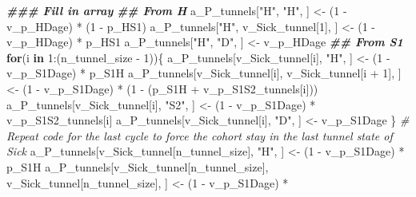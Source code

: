 \documentclass[
]{article}
\newenvironment{Shaded}{\begin{snugshade}}{\end{snugshade}}
\newcommand{\CommentTok}[1]{\textcolor[rgb]{0.56,0.35,0.01}{\textit{#1}}}
\newcommand{\ControlFlowTok}[1]{\textcolor[rgb]{0.13,0.29,0.53}{\textbf{#1}}}
\newcommand{\DecValTok}[1]{\textcolor[rgb]{0.00,0.00,0.81}{#1}}
\newcommand{\DocumentationTok}[1]{\textcolor[rgb]{0.56,0.35,0.01}{\textbf{\textit{#1}}}}
\newcommand{\NormalTok}[1]{#1}
\newcommand{\OtherTok}[1]{\textcolor[rgb]{0.56,0.35,0.01}{#1}}
\newcommand{\SpecialCharTok}[1]{\textcolor[rgb]{0.00,0.00,0.00}{#1}}
\newcommand{\StringTok}[1]{\textcolor[rgb]{0.31,0.60,0.02}{#1}}
\begin{document}
\begin{Shaded}
\begin{Highlighting}[]
\DocumentationTok{\#\#\# Fill in array}
\DocumentationTok{\#\# From H}
\NormalTok{a\_P\_tunnels[}\StringTok{"H"}\NormalTok{, }\StringTok{"H"}\NormalTok{, ]              }\OtherTok{\textless{}{-}}\NormalTok{ (}\DecValTok{1} \SpecialCharTok{{-}}\NormalTok{ v\_p\_HDage) }\SpecialCharTok{*}\NormalTok{ (}\DecValTok{1} \SpecialCharTok{{-}}\NormalTok{ p\_HS1)}
\NormalTok{a\_P\_tunnels[}\StringTok{"H"}\NormalTok{, v\_Sick\_tunnel[}\DecValTok{1}\NormalTok{], ] }\OtherTok{\textless{}{-}}\NormalTok{ (}\DecValTok{1} \SpecialCharTok{{-}}\NormalTok{ v\_p\_HDage) }\SpecialCharTok{*}\NormalTok{ p\_HS1}
\NormalTok{a\_P\_tunnels[}\StringTok{"H"}\NormalTok{, }\StringTok{"D"}\NormalTok{, ]              }\OtherTok{\textless{}{-}}\NormalTok{ v\_p\_HDage}
\DocumentationTok{\#\# From S1}
\ControlFlowTok{for}\NormalTok{(i }\ControlFlowTok{in} \DecValTok{1}\SpecialCharTok{:}\NormalTok{(n\_tunnel\_size }\SpecialCharTok{{-}} \DecValTok{1}\NormalTok{))\{}
\NormalTok{  a\_P\_tunnels[v\_Sick\_tunnel[i], }\StringTok{"H"}\NormalTok{, ]  }\OtherTok{\textless{}{-}}\NormalTok{ (}\DecValTok{1} \SpecialCharTok{{-}}\NormalTok{ v\_p\_S1Dage) }\SpecialCharTok{*}\NormalTok{ p\_S1H}
\NormalTok{  a\_P\_tunnels[v\_Sick\_tunnel[i], }
\NormalTok{              v\_Sick\_tunnel[i }\SpecialCharTok{+} \DecValTok{1}\NormalTok{], ]   }\OtherTok{\textless{}{-}}\NormalTok{ (}\DecValTok{1} \SpecialCharTok{{-}}\NormalTok{ v\_p\_S1Dage) }\SpecialCharTok{*}
\NormalTok{                                           (}\DecValTok{1} \SpecialCharTok{{-}}\NormalTok{ (p\_S1H }\SpecialCharTok{+}\NormalTok{ v\_p\_S1S2\_tunnels[i]))}
\NormalTok{  a\_P\_tunnels[v\_Sick\_tunnel[i], }\StringTok{"S2"}\NormalTok{, ] }\OtherTok{\textless{}{-}}\NormalTok{ (}\DecValTok{1} \SpecialCharTok{{-}}\NormalTok{ v\_p\_S1Dage) }\SpecialCharTok{*}\NormalTok{ v\_p\_S1S2\_tunnels[i]}
\NormalTok{  a\_P\_tunnels[v\_Sick\_tunnel[i], }\StringTok{"D"}\NormalTok{, ]  }\OtherTok{\textless{}{-}}\NormalTok{ v\_p\_S1Dage}
\NormalTok{\}}
\CommentTok{\# Repeat code for the last cycle to force the cohort stay in the last tunnel state of Sick}
\NormalTok{a\_P\_tunnels[v\_Sick\_tunnel[n\_tunnel\_size], }\StringTok{"H"}\NormalTok{, ]  }\OtherTok{\textless{}{-}}\NormalTok{ (}\DecValTok{1} \SpecialCharTok{{-}}\NormalTok{ v\_p\_S1Dage) }\SpecialCharTok{*}\NormalTok{ p\_S1H}
\NormalTok{a\_P\_tunnels[v\_Sick\_tunnel[n\_tunnel\_size],}
\NormalTok{            v\_Sick\_tunnel[n\_tunnel\_size], ] }\OtherTok{\textless{}{-}}\NormalTok{ (}\DecValTok{1} \SpecialCharTok{{-}}\NormalTok{ v\_p\_S1Dage) }\SpecialCharTok{*}

\end{Highlighting}
\end{Shaded}
\end{document}
